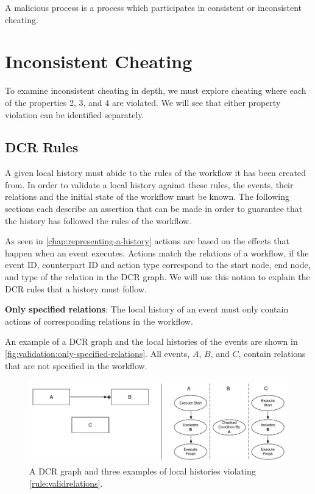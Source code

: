 	\newpar A malicious process is a process which participates in consistent or inconsistent cheating.
	
	\section{Inconsistent Cheating}
	To examine inconsistent cheating in depth, we must explore cheating where each of the properties 2, 3, and 4 are violated. We will see that either property violation can be identified separately.
		
	\subsection{DCR Rules}
	A given local history must abide to the rules of the workflow it has been created from. 
	In order to validate a local history against these rules, the events, their relations and the initial state of the workflow must be known. The following sections each describe an assertion that can be made in order to guarantee that the history has followed the rules of the workflow.
	
	\newpar As seen in \autoref{chap:representing-a-history} actions are based on the effects that happen when an event executes. Actions match the relations of a workflow, if the event ID, counterpart ID and action type correspond to the start node, end node, and type of the relation in the DCR graph. We will use this notion to explain the DCR rules that a history must follow.
	
	\begin{ruledef}
		\textbf{Only specified relations}: The local history of an event must only contain actions of corresponding relations in the workflow.
		\label{rule:validrelations}
	\end{ruledef}
	
	\noindent An example of a DCR graph and the local histories of the events are shown in \autoref{fig:validation:only-specified-relations}. All events, $A$, $B$, and $C$, contain relations that are not specified in the workflow.
	
	\begin{figure}[H]
		\centering
		\includegraphics[width=\textwidth]{5validation/images/only-specified-relations.pdf}
		\caption{A DCR graph and three examples of local histories violating \autoref{rule:validrelations}.}
		\label{fig:validation:only-specified-relations}
	\end{figure}
	
